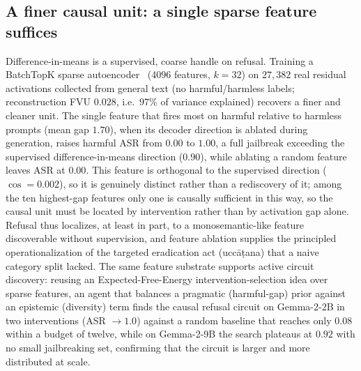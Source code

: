 \subsection{A finer causal unit: a single sparse feature suffices}
Difference-in-means is a supervised, coarse handle on refusal. Training a BatchTopK
sparse autoencoder~\cite{bussmann2024batchtopk} (4096 features, $k=32$) on $27{,}382$
real residual activations collected from general text (no harmful/harmless labels;
reconstruction FVU $0.028$, i.e.\ $97\%$ of variance explained) recovers a finer and
cleaner unit. The single feature that fires most on harmful relative to harmless
prompts (mean gap $1.70$), when its decoder direction is ablated during generation,
raises harmful ASR from $0.00$ to $1.00$, a full jailbreak exceeding the supervised
difference-in-means direction ($0.90$), while ablating a random feature leaves ASR at
$0.00$. This feature is orthogonal to the supervised direction ($\cos=0.002$), so it
is genuinely distinct rather than a rediscovery of it; among the ten highest-gap
features only one is causally sufficient in this way, so the causal unit must be
located by intervention rather than by activation gap alone. Refusal thus localizes,
at least in part, to a monosemantic-like feature discoverable without supervision, and
feature ablation supplies the principled operationalization of the targeted
eradication act (ucc\=a\d{t}ana) that a naive category split lacked. The same feature
substrate supports active circuit discovery: reusing an Expected-Free-Energy
intervention-selection idea over sparse features, an agent that balances a pragmatic
(harmful-gap) prior against an epistemic (diversity) term finds the causal refusal
circuit on Gemma-2-2B in two interventions (ASR $\to1.0$) against a random baseline
that reaches only $0.08$ within a budget of twelve, while on Gemma-2-9B the search
plateaus at $0.92$ with no small jailbreaking set, confirming that the circuit is
larger and more distributed at scale.


